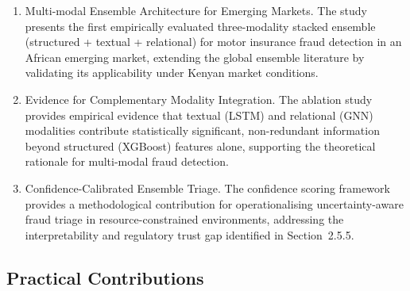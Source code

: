 \documentclass[12pt,a4paper,oneside]{report}
\numberwithin{equation}{chapter}
\begin{document}
\begin{enumerate}[leftmargin=*, label=\textbf{\arabic*.}]

  \item Multi-modal Ensemble Architecture for Emerging Markets.
  The study presents the first empirically evaluated three-modality stacked ensemble
  (structured + textual + relational) for motor insurance fraud detection in an African emerging
  market, extending the global ensemble literature \cite{schrijver2024automobile,Eteng2025} by
  validating its applicability under Kenyan market conditions.

  \item Evidence for Complementary Modality Integration.
  The ablation study provides empirical evidence that textual (LSTM) and relational (GNN)
  modalities contribute statistically significant, non-redundant information beyond structured
  (XGBoost) features alone, supporting the theoretical rationale for multi-modal fraud detection.

  \item Confidence-Calibrated Ensemble Triage.
  The confidence scoring framework provides a methodological contribution for operationalising
  uncertainty-aware fraud triage in resource-constrained environments, addressing the
  interpretability and regulatory trust gap identified in Section~2.5.5.

\end{enumerate}

\subsection{Practical Contributions}
\end{document}
